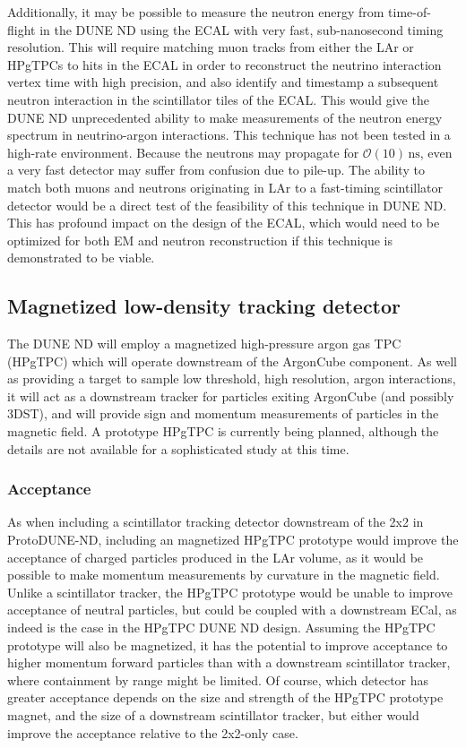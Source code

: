 Additionally, it may be possible to measure the neutron energy from time-of-flight in the DUNE ND using the ECAL with very fast, sub-nanosecond timing resolution. This will require matching muon tracks from either the LAr or HPgTPCs to hits in the ECAL in order to reconstruct the neutrino interaction vertex time with high precision, and also identify and timestamp a subsequent neutron interaction in the scintillator tiles of the ECAL. This would give the DUNE ND unprecedented ability to make measurements of the neutron energy spectrum in neutrino-argon interactions. This technique has not been tested in a high-rate environment. Because the neutrons may propagate for $\mathcal{O}\left(10\right)\,\mathrm{ns}$, even a very fast detector may suffer from confusion due to pile-up. The ability to match both muons and neutrons originating in LAr to a fast-timing scintillator detector would be a direct test of the feasibility of this technique in DUNE ND. This has profound impact on the design of the ECAL, which would need to be optimized for both EM and neutron reconstruction if this technique is demonstrated to be viable.
 
\subsection{Magnetized low-density tracking detector}
The DUNE ND will employ a magnetized high-pressure argon gas TPC (HPgTPC) which will operate downstream of the ArgonCube component. As well as providing a target to sample low threshold, high resolution, argon interactions, it will act as a downstream tracker for particles exiting ArgonCube (and possibly 3DST), and will provide sign and momentum measurements of particles in the magnetic field. A prototype HPgTPC is currently being planned, although the details are not available for a sophisticated study at this time.

\subsubsection{Acceptance}
As when including a scintillator tracking detector downstream of the 2x2 in ProtoDUNE-ND, including an magnetized HPgTPC prototype would improve the acceptance of charged particles produced in the LAr volume, as it would be possible to make momentum measurements by curvature in the magnetic field. Unlike a scintillator tracker, the HPgTPC prototype would be unable to improve acceptance of neutral particles, but could be coupled with a downstream ECal, as indeed is the case in the HPgTPC DUNE ND design. Assuming the HPgTPC prototype will also be magnetized, it has the potential to improve acceptance to higher momentum forward particles than with a downstream scintillator tracker, where containment by range might be limited. Of course, which detector has greater acceptance depends on the size and strength of the HPgTPC prototype magnet, and the size of a downstream scintillator tracker, but either would improve the acceptance relative to the 2x2-only case.

